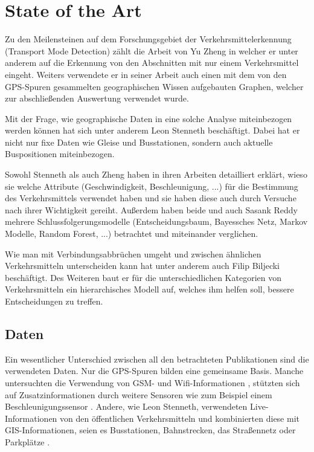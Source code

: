 \chapter{State of the Art}
Zu den Meilensteinen auf dem Forschungsgebiet der Verkehrsmittelerkennung (Transport Mode Detection) zählt die Arbeit von Yu Zheng in welcher er unter anderem auf die Erkennung von den Abschnitten mit nur einem Verkehrsmittel eingeht. Weiters verwendete er in seiner Arbeit auch einen mit dem von den GPS-Spuren gesammelten geographischen Wissen aufgebauten Graphen, welcher zur abschließenden Auswertung verwendet wurde.\cite{zheng_understanding_2010} \cite{zheng_understanding_2008} \cite{zheng_learning_2008}

Mit der Frage, wie geographische Daten in eine solche Analyse miteinbezogen werden können hat sich unter anderem Leon Stenneth beschäftigt. Dabei hat er nicht nur fixe Daten wie Gleise und Busstationen, sondern auch aktuelle Buspositionen miteinbezogen. \cite{stenneth_transportation_2011}

Sowohl Stenneth als auch Zheng haben in ihren Arbeiten detailliert erklärt, wieso sie welche Attribute (Geschwindigkeit, Beschleunigung, ...) für die Bestimmung des Verkehrsmittels verwendet haben und sie haben diese auch durch Versuche nach ihrer Wichtigkeit gereiht. Außerdem haben beide und auch Sasank Reddy \cite{reddy_determining_2008} mehrere Schlussfolgerungsmodelle (Entscheidungsbaum, Bayessches Netz, Markov Modelle, Random Forest, ...) betrachtet und miteinander verglichen. 

Wie man mit Verbindungsabbrüchen umgeht und zwischen ähnlichen Verkehrsmitteln unterscheiden kann hat unter anderem auch Filip Biljecki beschäftigt. Des Weiteren baut er für die unterschiedlichen Kategorien von Verkehrsmitteln ein hierarchisches Modell auf, welches ihm helfen soll, bessere Entscheidungen zu treffen. \cite{biljecki_transportation_2013}

\section{Daten}
Ein wesentlicher Unterschied zwischen all den betrachteten Publikationen sind die verwendeten Daten. Nur die GPS-Spuren bilden eine gemeinsame Basis. Manche untersuchten die Verwendung von GSM- und Wifi-Informationen \cite{reddy_using_2010}, stützten sich auf Zusatzinformationen durch weitere Sensoren wie zum Beispiel einem Beschleunigungssensor \cite{reddy_using_2010}  \cite{nadine_schussler_improving_2011}. Andere, wie Leon Stenneth, verwendeten Live-Informationen von den öffentlichen Verkehrsmitteln und kombinierten diese mit GIS-Informationen, seien es Busstationen, Bahnstrecken, das Straßennetz oder Parkplätze \cite{stenneth_transportation_2011}.

